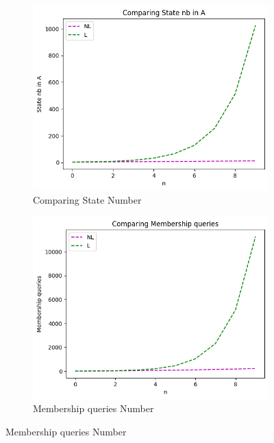\begin{figure}[!htb]
  \centering
  \begin{subfigure}[b]{0.25\textwidth}
    \includegraphics[width=\textwidth]{../statistics/plots/wrostDFA/State nb in A.png}
    \caption{Comparing State Number}
    \label{fig:StateWrostDFACompare}
  \end{subfigure}
  \begin{subfigure}[b]{0.25\textwidth}
    \includegraphics[width=\textwidth]{../statistics/plots/wrostDFA/Membership queries.png}
    \caption{Membership queries Number}
    \label{fig:MemberWrostDFACompare}
  \end{subfigure}

\end{figure}
